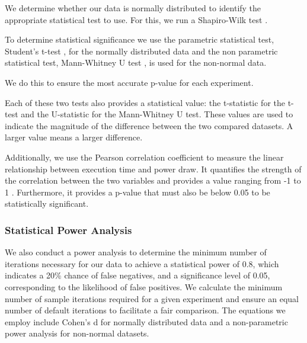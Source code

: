 \documentclass[main.tex]{subfiles}
\begin{document}
We determine whether our data is normally distributed to identify the appropriate statistical test to use. For this, we run a Shapiro-Wilk test \cite{shapiro1965analysis}.

To determine statistical significance we use the parametric statistical test, Student's t-test \cite{student1908}, for the normally distributed data and the non parametric statistical test, Mann-Whitney U test \cite{mann1947test}, is used for the non-normal data. 

We do this to ensure the most accurate p-value for each experiment.

Each of these two tests also provides a statistical value: the t-statistic for the t-test and the U-statistic for the Mann-Whitney U test. These values are used to indicate the magnitude of the difference between the two compared datasets. A larger value means a larger difference. 

Additionally, we use the Pearson correlation coefficient to measure the linear relationship between execution time and power draw. It quantifies the strength of the correlation between the two variables and provides a value ranging from -1 to 1 \cite{sedgwick2012pearson}. Furthermore, it provides a p-value that must also be below 0.05 to be statistically significant. 

\subsubsection{Statistical Power Analysis}
We also conduct a power analysis to determine the minimum number of iterations necessary for our data to achieve a statistical power of 0.8, which indicates a 20\% chance of false negatives, and a significance level of 0.05, corresponding to the likelihood of false positives. We calculate the minimum number of sample iterations required for a given experiment and ensure an equal number of default iterations to facilitate a fair comparison. The equations we employ include Cohen's d \cite{cohen1988} for normally distributed data and a non-parametric power analysis \cite{noether1987} for non-normal datasets.
 
\end{document}
